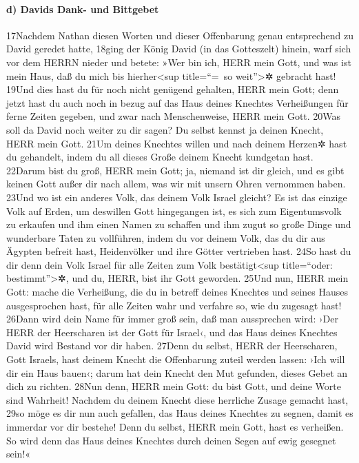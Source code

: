 \hypertarget{d-davids-dank--und-bittgebet}{%
\paragraph{d) Davids Dank- und
Bittgebet}\label{d-davids-dank--und-bittgebet}}

17Nachdem Nathan diesen Worten und dieser Offenbarung genau entsprechend
zu David geredet hatte, 18ging der König David (in das Gotteszelt)
hinein, warf sich vor dem HERRN nieder und betete: »Wer bin ich, HERR
mein Gott, und was ist mein Haus, daß du mich bis hierher\textless sup
title=``=~so weit''\textgreater✲ gebracht hast! 19Und dies hast du für
noch nicht genügend gehalten, HERR mein Gott; denn jetzt hast du auch
noch in bezug auf das Haus deines Knechtes Verheißungen für ferne Zeiten
gegeben, und zwar nach Menschenweise, HERR mein Gott. 20Was soll da
David noch weiter zu dir sagen? Du selbst kennst ja deinen Knecht, HERR
mein Gott. 21Um deines Knechtes willen und nach deinem Herzen✲ hast du
gehandelt, indem du all dieses Große deinem Knecht kundgetan hast.
22Darum bist du groß, HERR mein Gott; ja, niemand ist dir gleich, und es
gibt keinen Gott außer dir nach allem, was wir mit unsern Ohren
vernommen haben. 23Und wo ist ein anderes Volk, das deinem Volk Israel
gleicht? Es ist das einzige Volk auf Erden, um deswillen Gott
hingegangen ist, es sich zum Eigentumsvolk zu erkaufen und ihm einen
Namen zu schaffen und ihm zugut so große Dinge und wunderbare Taten zu
vollführen, indem du vor deinem Volk, das du dir aus Ägypten befreit
hast, Heidenvölker und ihre Götter vertrieben hast. 24So hast du dir
denn dein Volk Israel für alle Zeiten zum Volk bestätigt\textless sup
title=``oder: bestimmt''\textgreater✲, und du, HERR, bist ihr Gott
geworden. 25Und nun, HERR mein Gott: mache die Verheißung, die du in
betreff deines Knechtes und seines Hauses ausgesprochen hast, für alle
Zeiten wahr und verfahre so, wie du zugesagt hast! 26Dann wird dein Name
für immer groß sein, daß man aussprechen wird: ›Der HERR der Heerscharen
ist der Gott für Israel‹, und das Haus deines Knechtes David wird
Bestand vor dir haben. 27Denn du selbst, HERR der Heerscharen, Gott
Israels, hast deinem Knecht die Offenbarung zuteil werden lassen: ›Ich
will dir ein Haus bauen‹; darum hat dein Knecht den Mut gefunden, dieses
Gebet an dich zu richten. 28Nun denn, HERR mein Gott: du bist Gott, und
deine Worte sind Wahrheit! Nachdem du deinem Knecht diese herrliche
Zusage gemacht hast, 29so möge es dir nun auch gefallen, das Haus deines
Knechtes zu segnen, damit es immerdar vor dir bestehe! Denn du selbst,
HERR mein Gott, hast es verheißen. So wird denn das Haus deines Knechtes
durch deinen Segen auf ewig gesegnet sein!«

